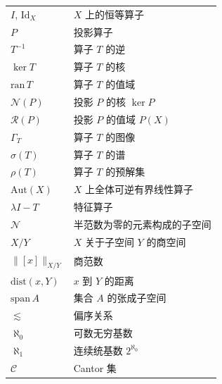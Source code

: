 {\begin{longtable}{p{3.2cm}p{\dimexpr\linewidth-3.4cm-4\tabcolsep\relax}}
    $I$, $\mathrm{Id}_X$ & $X$ 上的恒等算子 \\
    $P$ & 投影算子 \\
    $T^{-1}$ & 算子 $T$ 的逆 \\
    $\ker T$ & 算子 $T$ 的核 \\
    $\mathrm{ran}\, T$ & 算子 $T$ 的值域 \\
    $\mathcal{N}(P)$ & 投影 $P$ 的核 $\ker P$ \\
    $\mathcal{R}(P)$ & 投影 $P$ 的值域 $P(X)$ \\
    $\Gamma_T$ & 算子 $T$ 的图像 \\
    $\sigma(T)$ & 算子 $T$ 的谱 \\
    $\rho(T)$ & 算子 $T$ 的预解集 \\
    $\mathrm{Aut}(X)$ & $X$ 上全体可逆有界线性算子 \\
    $\lambda I-T$ & 特征算子 \\ 
    $\mathcal{N}$ & 半范数为零的元素构成的子空间 \\
    $X/Y$ & $X$ 关于子空间 $Y$ 的商空间 \\
    $\big\|[x]\big\|_{X/Y}$ & 商范数 \\
    $\mathrm{dist}(x,Y)$ & $x$ 到 $Y$ 的距离 \\
    $\mathrm{span}\, A$ & 集合 $A$ 的张成子空间 \\
    $\lesssim$ & 偏序关系 \\
    $\aleph_0$ & 可数无穷基数 \\
    $\aleph_1$ & 连续统基数 $2^{\aleph_0}$ \\
    $\mathcal{C}$ & Cantor 集 \\
\end{longtable}
}